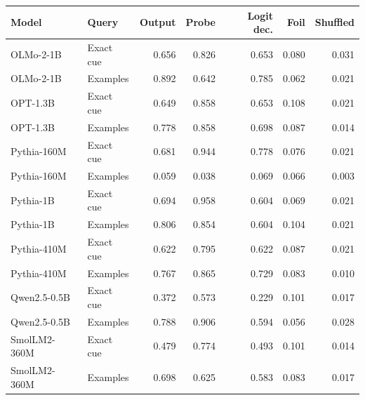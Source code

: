 \begin{tabular}{@{}llrrrrr@{}}
\toprule
Model & Query & Output & Probe & Logit dec. & Foil & Shuffled \\
\midrule
OLMo-2-1B & Exact cue & 0.656 & 0.826 & 0.653 & 0.080 & 0.031 \\
OLMo-2-1B & Examples & 0.892 & 0.642 & 0.785 & 0.062 & 0.021 \\
OPT-1.3B & Exact cue & 0.649 & 0.858 & 0.653 & 0.108 & 0.021 \\
OPT-1.3B & Examples & 0.778 & 0.858 & 0.698 & 0.087 & 0.014 \\
Pythia-160M & Exact cue & 0.681 & 0.944 & 0.778 & 0.076 & 0.021 \\
Pythia-160M & Examples & 0.059 & 0.038 & 0.069 & 0.066 & 0.003 \\
Pythia-1B & Exact cue & 0.694 & 0.958 & 0.604 & 0.069 & 0.021 \\
Pythia-1B & Examples & 0.806 & 0.854 & 0.604 & 0.104 & 0.021 \\
Pythia-410M & Exact cue & 0.622 & 0.795 & 0.622 & 0.087 & 0.021 \\
Pythia-410M & Examples & 0.767 & 0.865 & 0.729 & 0.083 & 0.010 \\
Qwen2.5-0.5B & Exact cue & 0.372 & 0.573 & 0.229 & 0.101 & 0.017 \\
Qwen2.5-0.5B & Examples & 0.788 & 0.906 & 0.594 & 0.056 & 0.028 \\
SmolLM2-360M & Exact cue & 0.479 & 0.774 & 0.493 & 0.101 & 0.014 \\
SmolLM2-360M & Examples & 0.698 & 0.625 & 0.583 & 0.083 & 0.017 \\
\bottomrule
\end{tabular}
